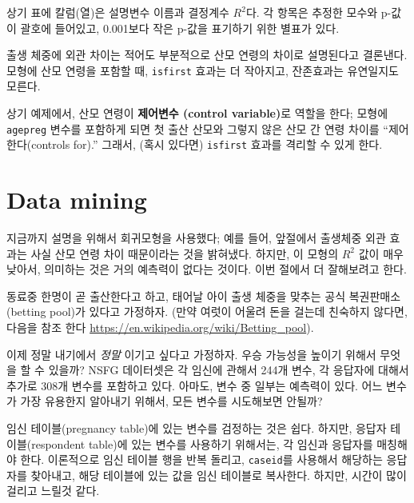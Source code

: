 상기 표에 칼럼(열)은 설명변수 이름과 결정계수 $R^2$다. 
각 항목은 추정한 모수와 p-값이 괄호에 들어있고, 0.001보다 작은 p-값을 표기하기 위한 별표가 있다.

출생 체중에 외관 차이는 적어도 부분적으로 산모 연령의 차이로 설명된다고 결론낸다. 모형에 산모 연령을 포함할 때, {\tt isfirst} 효과는 더 작아지고, 잔존효과는 유연일지도 모른다.

상기 예제에서, 산모 연령이 {\bf 제어변수 (control variable)}로 역할을 한다; 모형에 {\tt agepreg} 변수를 포함하게 되면 첫 출산 산모와 그렇지 않은 산모 간 연령 차이를 ``제어한다(controls for).''
그래서, (혹시 있다면) {\tt isfirst} 효과를 격리할 수 있게 한다.


\section{Data mining}
\label{mining}

지금까지 설명을 위해서 회귀모형을 사용했다; 예를 들어, 앞절에서 출생체중 외관 효과는 사실 산모 연령 차이 때문이라는 것을 밝혀냈다.
하지만, 이 모형의 $R^2$ 값이 매우 낮아서, 의미하는 것은 거의 예측력이 없다는 것이다. 이번 절에서 더 잘해보려고 한다.


동료중 한명이 곧 출산한다고 하고, 태어날 아이 출생 체중을 맞추는 공식 복권판매소(betting pool)가 있다고 가정하자. (만약 여럿이 어울려 돈을 걸는데 친숙하지 않다면, 다음을 참조 한다 \url{https://en.wikipedia.org/wiki/Betting_pool}).

이제 정말 내기에서 {\em 정말} 이기고 싶다고 가정하자.
우승 가능성을 높이기 위해서 무엇을 할 수 있을까?
NSFG 데이터셋은 각 임신에 관해서 244개 변수, 각 응답자에 대해서 추가로 308개 변수를 포함하고 있다. 아마도, 변수 중 일부는 예측력이 있다.
어느 변수가 가장 유용한지 알아내기 위해서, 모든 변수를 시도해보면 안될까?

임신 테이블(pregnancy table)에 있는 변수를 검정하는 것은 쉽다. 하지만, 응답자 테이블(respondent table)에 있는 변수를 사용하기 위해서는, 각 임신과 응답자를 매칭해야 한다. 이론적으로 임신 테이블 행을 반복 돌리고, {\tt caseid}를 사용해서 해당하는 응답자를 찾아내고, 해당 테이블에 있는 값을 임신 테이블로 복사한다. 하지만, 시간이 많이 걸리고 느릴것 같다.

